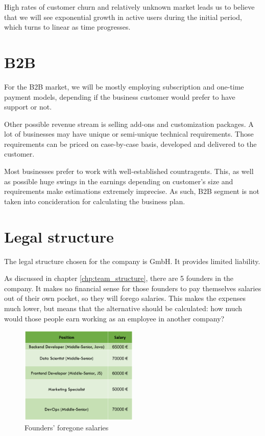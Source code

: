 High rates of customer churn and relatively unknown market leads us to believe that we will see exponential growth in active users during the initial period, which turns to linear as time progresses.

\section{B2B}
For the B2B market, we will be mostly employing subscription and one-time payment models, depending if the business customer would prefer to have support or not.

\p
Other possible revenue stream is selling add-ons and customization packages. A lot of businesses may have unique or semi-unique technical requirements. Those requirements can be priced on case-by-case basis, developed and delivered to the customer.

\p
Most businesses prefer to work with well-established countragents. This, as well as possible huge swings in the earnings depending on customer's size and requirements make estimations extremely imprecise. As such, B2B segment is not taken into concideration for calculating the business plan.

\section{Legal structure}
The legal structure chosen for the company is GmbH. It provides limited liability.

\p
As discussed in chapter \ref{chp:team_structure}, there are 5 founders in the company. It makes no financial sense for those founders to pay themselves salaries out of their own pocket, so they will forego salaries. This makes the expenses much lower, but means that the alternative should be calculated: how much would those people earn working as an employee in another company?

\begin{figure}[H]
    \centering
    \includegraphics[width=0.5\textwidth]{figures/founder_salaries.png}
    \caption{Founders' foregone salaries}
    \label{fig:founder_salaries}
\end{figure}

